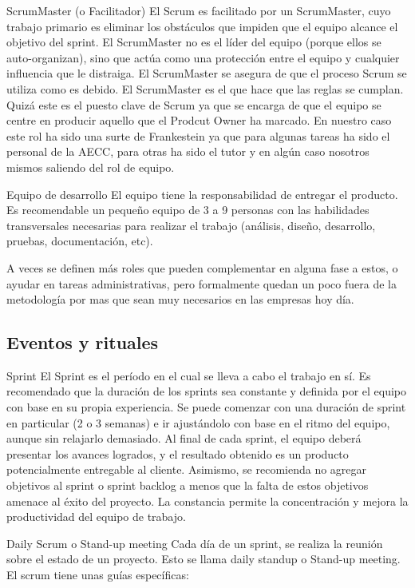 \documentclass[../pfc.tex]{subfiles}
\begin{document}
	ScrumMaster (o Facilitador)
	El Scrum es facilitado por un ScrumMaster, cuyo trabajo primario es eliminar los obstáculos que impiden que el equipo alcance el objetivo del sprint. El ScrumMaster no es el líder del equipo (porque ellos se auto-organizan), sino que actúa como una protección entre el equipo y cualquier influencia que le distraiga. El ScrumMaster se asegura de que el proceso Scrum se utiliza como es debido. El ScrumMaster es el que hace que las reglas se cumplan. Quizá este es el puesto clave de Scrum ya que se encarga de que el equipo se centre en producir aquello que el Prodcut Owner ha marcado. En nuestro caso este rol ha sido una surte de Frankestein ya que para algunas tareas ha sido el personal de la AECC, para otras ha sido el tutor y en algún caso nosotros mismos saliendo del rol de equipo. 
	
	Equipo de desarrollo
	El equipo tiene la responsabilidad de entregar el producto. Es recomendable un pequeño equipo de 3 a 9 personas con las habilidades transversales necesarias para realizar el trabajo (análisis, diseño, desarrollo, pruebas, documentación, etc).
	
	A veces se definen más roles que pueden complementar en alguna fase a estos, o ayudar en tareas administrativas, pero formalmente quedan un poco fuera de la metodología por mas que sean muy necesarios en las empresas hoy día.
	
	\subsection{Eventos y rituales}
		
	Sprint 
	El Sprint es el período en el cual se lleva a cabo el trabajo en sí. Es recomendado que la duración de los sprints sea constante y definida por el equipo con base en su propia experiencia. Se puede comenzar con una duración de sprint en particular (2 o 3 semanas) e ir ajustándolo con base en el ritmo del equipo, aunque sin relajarlo demasiado. Al final de cada sprint, el equipo deberá presentar los avances logrados, y el resultado obtenido es un producto potencialmente entregable al cliente. Asimismo, se recomienda no agregar objetivos al sprint o sprint backlog a menos que la falta de estos objetivos amenace al éxito del proyecto. La constancia permite la concentración y mejora la productividad del equipo de trabajo.
	
	Daily Scrum o Stand-up meeting
	Cada día de un sprint, se realiza la reunión sobre el estado de un proyecto. Esto se llama daily standup o Stand-up meeting. El scrum tiene unas guías específicas:
	
\end{document}
